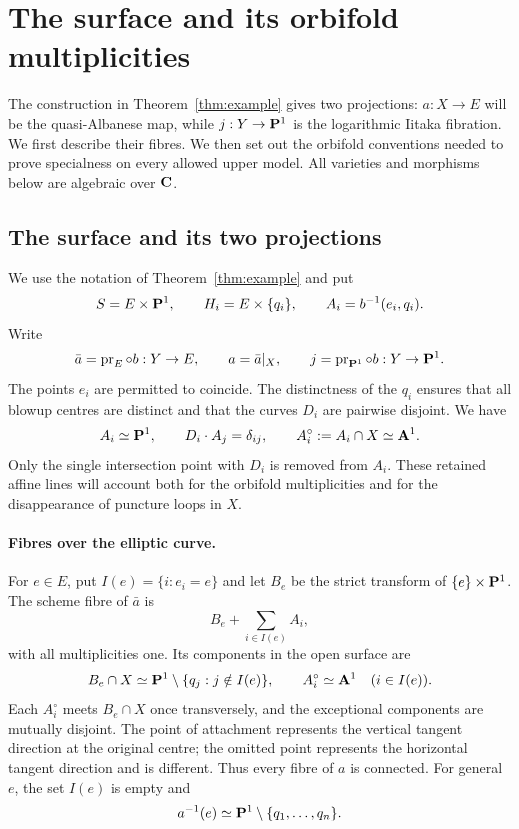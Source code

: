 \section{The surface and its orbifold multiplicities}\label{sec:definitions}

The construction in Theorem~\ref{thm:example} gives two projections:
$a:X\to E$ will be the quasi-Albanese map, while $j:Y\to\mathbf P^1$ is
the logarithmic Iitaka fibration. We first describe their fibres.
We then set out the orbifold conventions needed to prove specialness
on every allowed upper model. All varieties and morphisms below are
algebraic over $\mathbf C$.

\subsection{The surface and its two projections}
We use the notation of Theorem~\ref{thm:example} and put
\[
 S=E\times\mathbf P^1,\qquad H_i=E\times\{q_i\},\qquad
 A_i=b^{-1}(e_i,q_i).
\]
Write
\[
 \bar a=\operatorname{pr}_E\circ b:Y\to E,\qquad
 a=\bar a|_X,\qquad
 j=\operatorname{pr}_{\mathbf P^1}\circ b:Y\to\mathbf P^1.
\]
The points $e_i$ are permitted to coincide. The distinctness of the $q_i$
ensures that all blowup centres are distinct and that the curves $D_i$
are pairwise disjoint. We have
\begin{equation}\label{eq:intersection}
 A_i\simeq\mathbf P^1,\qquad D_i\cdot A_j=\delta_{ij},\qquad
 A_i^\circ:=A_i\cap X\simeq\mathbf A^1.
\end{equation}
Only the single intersection point with $D_i$ is removed from $A_i$.
These retained affine lines will account both for the orbifold
multiplicities and for the disappearance of puncture loops in $X$.

\paragraph{Fibres over the elliptic curve.}
For $e\in E$, put $I(e)=\{i:e_i=e\}$ and let $B_e$ be the strict
transform of $\{e\}\times\mathbf P^1$. The scheme fibre of $\bar a$ is
\[
 B_e+\sum_{i\in I(e)}A_i,
\]
with all multiplicities one. Its components in the open surface are
\[
 B_e\cap X\simeq\mathbf P^1\setminus\{q_j:j\notin I(e)\},
 \qquad A_i^\circ\simeq\mathbf A^1\quad(i\in I(e)).
\]
Each $A_i^\circ$ meets $B_e\cap X$ once transversely, and the exceptional
components are mutually disjoint. The point of attachment represents the
vertical tangent direction at the original centre; the omitted point
represents the horizontal tangent direction and is different. Thus every
fibre of $a$ is connected. For general $e$, the set $I(e)$ is empty and
\begin{equation}\label{eq:general-a-fibre}
 a^{-1}(e)\simeq\mathbf P^1\setminus\{q_1,\ldots,q_n\}.
\end{equation}

